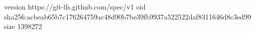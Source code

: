 version https://git-lfs.github.com/spec/v1
oid sha256:acbeab65b7c176264759ac48d90b7be39fb9937a522522daf8311646d8c3ed99
size 1398272
